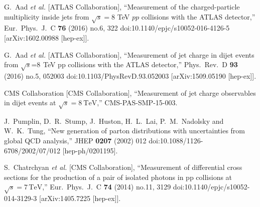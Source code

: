 \documentclass{PoS}
\begin{document}
\begin{thebibliography}{99}
  G.~Aad {\it et al.} [ATLAS Collaboration],
  ``Measurement of the charged-particle multiplicity inside jets from $\sqrt{s}=8$ TeV $pp$ collisions with the ATLAS detector,''
  Eur.\ Phys.\ J.\ C {\bf 76} (2016) no.6,  322
  doi:10.1140/epjc/s10052-016-4126-5
  [arXiv:1602.00988 [hep-ex]].

  G.~Aad {\it et al.} [ATLAS Collaboration],
  ``Measurement of jet charge in dijet events from $\sqrt{s}$=8  TeV pp collisions with the ATLAS detector,''
  Phys.\ Rev.\ D {\bf 93} (2016) no.5,  052003
  doi:10.1103/PhysRevD.93.052003
  [arXiv:1509.05190 [hep-ex]].

  CMS Collaboration [CMS Collaboration],
  ``Measurement of jet charge observables in dijet events at $\sqrt{s}=8~\mathrm{TeV}$,''
  CMS-PAS-SMP-15-003.

  J.~Pumplin, D.~R.~Stump, J.~Huston, H.~L.~Lai, P.~M.~Nadolsky and W.~K.~Tung,
  ``New generation of parton distributions with uncertainties from global QCD analysis,''
  JHEP {\bf 0207} (2002) 012
  doi:10.1088/1126-6708/2002/07/012
  [hep-ph/0201195].




  S.~Chatrchyan {\it et al.} [CMS Collaboration],
  ``Measurement of differential cross sections for the production of a pair of isolated photons in pp collisions at $\sqrt{s}=7\,\text {TeV} $,''
  Eur.\ Phys.\ J.\ C {\bf 74} (2014) no.11,  3129
  doi:10.1140/epjc/s10052-014-3129-3
  [arXiv:1405.7225 [hep-ex]].


\end{thebibliography}
\end{document}
